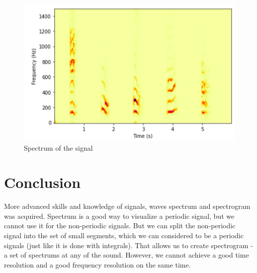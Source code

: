 \documentclass[a4paper]{article}
\begin{document}
            
            \begin{figure}[H]
                \centering
                \includegraphics[width=\textwidth]{img/aiueo.png}
                \caption{Spectrum of the signal}
                \label{fig:part6_1}
            \end{figure}
    
    \newpage
        \section{Conclusion}
            More advanced skills and knowledge of signals, waves spectrum and spectrogram was acquired. Spectrum is a good way to visualize a periodic signal, but we cannot use it for the non-periodic signals. But we can split the non-periodic signal into the set of small segments, which we can considered to be a periodic signals (just like it is done with integrals). That allows us to create spectrogram - a set of spectrums at any of the sound. However, we cannot achieve a good time resolution and a good frequency resolution on the same time.
    
\end{document}
